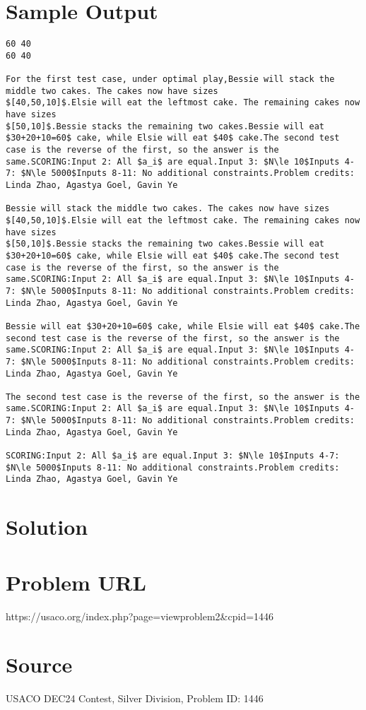 \documentclass[12pt]{article}
\begin{document}
\section*{Sample Output}
\begin{verbatim}
60 40
60 40

For the first test case, under optimal play,Bessie will stack the middle two cakes. The cakes now have sizes
$[40,50,10]$.Elsie will eat the leftmost cake. The remaining cakes now
have sizes
$[50,10]$.Bessie stacks the remaining two cakes.Bessie will eat $30+20+10=60$ cake, while Elsie will eat $40$ cake.The second test case is the reverse of the first, so the answer is the same.SCORING:Input 2: All $a_i$ are equal.Input 3: $N\le 10$Inputs 4-7: $N\le 5000$Inputs 8-11: No additional constraints.Problem credits: Linda Zhao, Agastya Goel, Gavin Ye

Bessie will stack the middle two cakes. The cakes now have sizes
$[40,50,10]$.Elsie will eat the leftmost cake. The remaining cakes now
have sizes
$[50,10]$.Bessie stacks the remaining two cakes.Bessie will eat $30+20+10=60$ cake, while Elsie will eat $40$ cake.The second test case is the reverse of the first, so the answer is the same.SCORING:Input 2: All $a_i$ are equal.Input 3: $N\le 10$Inputs 4-7: $N\le 5000$Inputs 8-11: No additional constraints.Problem credits: Linda Zhao, Agastya Goel, Gavin Ye

Bessie will eat $30+20+10=60$ cake, while Elsie will eat $40$ cake.The second test case is the reverse of the first, so the answer is the same.SCORING:Input 2: All $a_i$ are equal.Input 3: $N\le 10$Inputs 4-7: $N\le 5000$Inputs 8-11: No additional constraints.Problem credits: Linda Zhao, Agastya Goel, Gavin Ye

The second test case is the reverse of the first, so the answer is the same.SCORING:Input 2: All $a_i$ are equal.Input 3: $N\le 10$Inputs 4-7: $N\le 5000$Inputs 8-11: No additional constraints.Problem credits: Linda Zhao, Agastya Goel, Gavin Ye

SCORING:Input 2: All $a_i$ are equal.Input 3: $N\le 10$Inputs 4-7: $N\le 5000$Inputs 8-11: No additional constraints.Problem credits: Linda Zhao, Agastya Goel, Gavin Ye
\end{verbatim}

\section*{Solution}


\section*{Problem URL}
https://usaco.org/index.php?page=viewproblem2&cpid=1446

\section*{Source}
USACO DEC24 Contest, Silver Division, Problem ID: 1446
\end{document}
